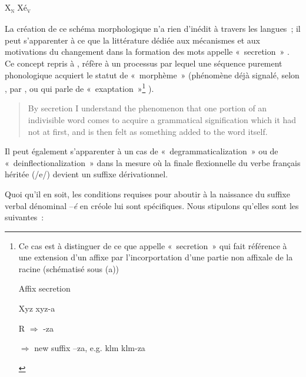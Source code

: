 \documentclass[output=paper]{langsci/langscibook}
\begin{document}
\ea \label{ex:VilloingDeglas:20} X\textsubscript{\textsc{n}} \textrightarrow{~} Xé\textsubscript{\textsc{v}}
\z

La création de ce schéma morphologique n'a rien d'inédit à travers les
langues~; il peut s'apparenter à ce que la littérature dédiée aux
mécanismes et aux motivations du changement dans la formation des mots
appelle «~secretion~» %
\citep[1771]{Rainer15}%
%
. Ce concept repris à %
\citet[384]{Jespersen22}
, réfère à un processus par lequel une séquence
purement phonologique acquiert le statut de «~morphème~» (phénomène déjà
signalé, selon %
\citealt{Rainer15}%
, par %
\citealt{Bloomfield1891}%
, ou 
\citealt{Lass90} %
%
 qui parle
de «~exaptation~»\footnote{Ce cas est à distinguer de
  ce que %
\citet[8--10]{Haspelmath1995} %
%
appelle «~secretion~» qui fait
  référence à une extension d'un affixe par l'incorportation d'une
  partie non affixale de la racine (schématisé sous (a))

\begin{exe}
 Affix secretion

  Xyz \textrightarrow{~} xyz-a

  R $\Rightarrow$ -za

  $\Rightarrow$ new suffix --za, e.g. klm \textrightarrow{~} klm-za
\end{exe}}%
).


  \begin{quote}
By secretion I understand the phenomenon that one portion of an
indivisible word comes to acquire a grammatical signification which it
had not at first, and is then felt as something added to the word
itself. %
\citep[1771]{Rainer15}%
%

\end{quote}

Il peut également s'apparenter à un cas de «~degrammaticalization~» ou
de «~deinflectionalization~» %
\citep[1768--69]{Rainer15} %
%
dans la mesure où
la finale flexionnelle du verbe français héritée (/e/) devient un
suffixe dérivationnel.

Quoi qu'il en soit, les conditions requises pour aboutir à la naissance
du suffixe verbal dénominal --\emph{é} en créole lui sont spécifiques.
Nous stipulons qu'elles sont les suivantes~:
\end{document}
